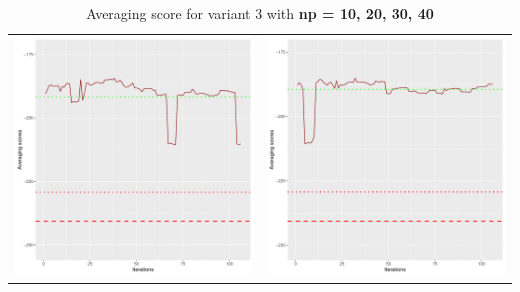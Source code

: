 \documentclass[]{scrartcl}
\begin{document}
\begin{table}[h!]
\begin{tabular}{cc}
\includegraphics[scale = 0.4]{./figs/asia/v3/30/avgBoundsEvolution-107.pdf} & 
\includegraphics[scale = 0.4]{./figs/asia/v3/40/avgBoundsEvolution-107.pdf} \\
\end{tabular}
\caption{Averaging score for variant 3 with \textbf{np =  10, 20, 30, 40}}
\end{table}
\end{document}
